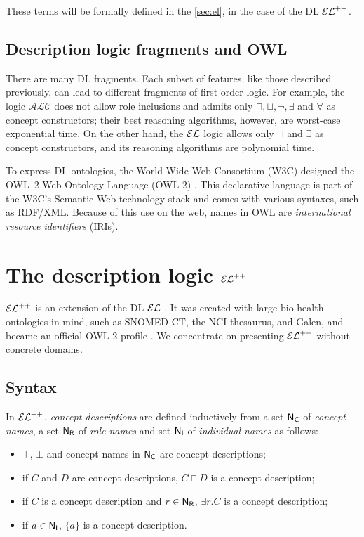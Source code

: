 These terms will be formally defined in the \autoref{sec:el}, in the case of the DL $\mathcal{EL}^{++}$.

\subsection{Description logic fragments and OWL}

There are many DL fragments. Each subset of features, like those described previously, can lead to different fragments of first-order logic. For example, the logic $\mathcal{ALC}$ does not allow role inclusions and admits only $\sqcap, \sqcup, \lnot, \exists$ and $\forall$ as concept constructors; their best reasoning algorithms, however, are worst-case exponential time. On the other hand, the $\mathcal{EL}$ logic allows only $\sqcap$ and $\exists$ as concept constructors, and its reasoning algorithms are polynomial time.

To express DL ontologies, the World Wide Web Consortium (W3C) designed the OWL~2 Web Ontology Language (OWL 2) \citep{owl2}. This declarative language is part of the W3C's Semantic Web technology stack and comes with various syntaxes, such as RDF/XML. Because of this use on the web, names in OWL are \emph{international resource identifiers} (IRIs).

\section{The description logic \texorpdfstring{$\mathcal{EL}^{++}$}{GEL++}}
\label{sec:el}

$\mathcal{EL}^{++}$ is an extension of the DL $\mathcal{EL}$ \citep{Baader2005a}. It was created with large bio-health ontologies in mind, such as SNOMED-CT, the NCI thesaurus, and Galen, and became an official OWL 2 profile \citep{owl2}. We concentrate on presenting $\mathcal{EL}^{++}$ without concrete domains.

\subsection{Syntax}
In $\mathcal{EL}^{++}$, \emph{concept descriptions} are defined inductively from a set $\mathsf{N_C}$ of \emph{concept names}, a set $\mathsf{N_R}$ of \emph{role names} and set $\mathsf{N_I}$ of \emph{individual names} as follows:
\begin{itemize}
	\item $\top$, $\bot$ and concept names in $\mathsf{N_C}$ are concept descriptions;
	\item if $C$ and $D$ are concept descriptions, $C \sqcap D$ is a concept description;
	\item if $C$ is a concept description and $r \in \mathsf{N_R}$, $\exists r.C$ is a concept description;
	\item if $a \in \mathsf{N_I}$, $\{a\}$ is a concept description.
\end{itemize}

